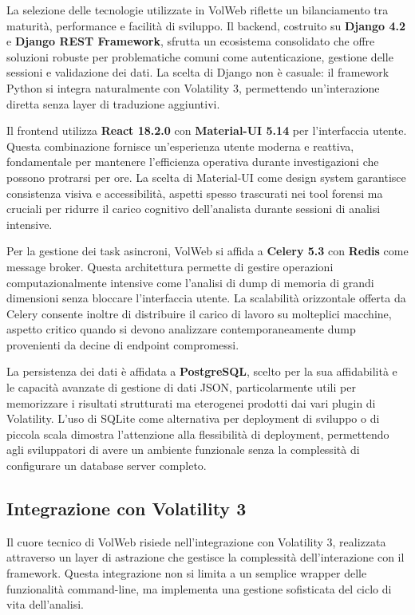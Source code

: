 La selezione delle tecnologie utilizzate in VolWeb riflette un bilanciamento tra maturità, performance e facilità di sviluppo. Il backend, costruito su \textbf{Django 4.2} e \textbf{Django REST Framework}, sfrutta un ecosistema consolidato che offre soluzioni robuste per problematiche comuni come autenticazione, gestione delle sessioni e validazione dei dati. La scelta di Django non è casuale: il framework Python si integra naturalmente con Volatility 3, permettendo un'interazione diretta senza layer di traduzione aggiuntivi.

Il frontend utilizza \textbf{React 18.2.0} con \textbf{Material-UI 5.14} per l'interfaccia utente. Questa combinazione fornisce un'esperienza utente moderna e reattiva, fondamentale per mantenere l'efficienza operativa durante investigazioni che possono protrarsi per ore. La scelta di Material-UI come design system garantisce consistenza visiva e accessibilità, aspetti spesso trascurati nei tool forensi ma cruciali per ridurre il carico cognitivo dell'analista durante sessioni di analisi intensive.

Per la gestione dei task asincroni, VolWeb si affida a \textbf{Celery 5.3} con \textbf{Redis} come message broker. Questa architettura permette di gestire operazioni computazionalmente intensive come l'analisi di dump di memoria di grandi dimensioni senza bloccare l'interfaccia utente. La scalabilità orizzontale offerta da Celery consente inoltre di distribuire il carico di lavoro su molteplici macchine, aspetto critico quando si devono analizzare contemporaneamente dump provenienti da decine di endpoint compromessi.

La persistenza dei dati è affidata a \textbf{PostgreSQL}, scelto per la sua affidabilità e le capacità avanzate di gestione di dati JSON, particolarmente utili per memorizzare i risultati strutturati ma eterogenei prodotti dai vari plugin di Volatility. L'uso di SQLite come alternativa per deployment di sviluppo o di piccola scala dimostra l'attenzione alla flessibilità di deployment, permettendo agli sviluppatori di avere un ambiente funzionale senza la complessità di configurare un database server completo.

\subsection{Integrazione con Volatility 3}

Il cuore tecnico di VolWeb risiede nell'integrazione con Volatility 3, realizzata attraverso un layer di astrazione che gestisce la complessità dell'interazione con il framework. Questa integrazione non si limita a un semplice wrapper delle funzionalità command-line, ma implementa una gestione sofisticata del ciclo di vita dell'analisi.

